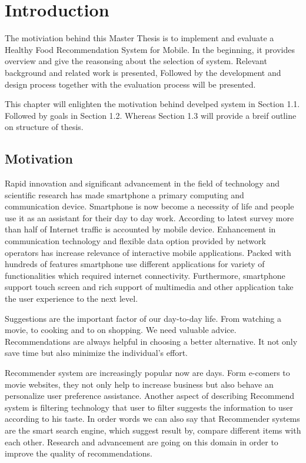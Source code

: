 \chapter{Introduction}
\setcounter{page}{1}%
\thispagestyle{empty}

The motiviation behind this Master Thesis is to implement and evaluate a Healthy Food Recommendation System for Mobile. In the beginning, it provides overview and give the reasonsing about the selection of system. Relevant background and related work is presented, Followed by the development and design process together with the evaluation process will be presented. \newline

This chapter will enlighten the motivation behind develped system in Section 1.1. Followed by goals in Section 1.2. Whereas Section 1.3 will provide a breif outline on structure of thesis.

\section{Motivation}\label{motivation}

Rapid innovation and significant advancement in the field of technology and scientific research has made smartphone a primary computing and communication device. Smartphone is now become a necessity of life and people use it as an assistant for their day to day work. According to latest survey more than half of Internet traffic is accounted by mobile device. Enhancement in communication technology and flexible data option provided by network operators has increase relevance of interactive mobile applications. Packed with hundreds of features smartphone use different applications for variety of functionalities which required internet connectivity. Furthermore, smartphone support touch screen and rich support of multimedia and other application take the user experience to the next level.\newline

Suggestions are the important factor of our day-to-day life. From watching a movie, to cooking and to on shopping. We need valuable advice. Recommendations are always helpful in choosing a better alternative. It not only save time but also minimize the individual's effort.\newline

Recommender system are increasingly popular now are days. Form e-comers to movie websites, they not only help to increase business but also behave an personalize user preference assistance. Another aspect of describing Recommend system is filtering technology that user to filter suggests the information to user according to his taste. In order words we can also say that Recommender systems are the smart search engine, which suggest result by, compare different items with each other. Research and advancement are going on this domain in order to improve the quality of recommendations. \newline 

